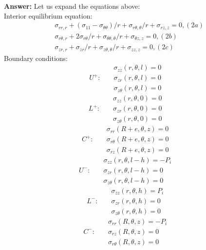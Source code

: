 \documentclass[letter,12pt]{article}
\begin{document}
\noindent \textbf{Answer:} Let us expand the equations above: \\
Interior equilibrium equation:
\begin{equation}
\begin{aligned}
& \sigma_{rr,r}+(\sigma_{11}-\sigma_{\theta \theta})/r +\sigma_{r\theta,\theta}/r +\sigma_{rz,z}=0, (2a) \\
& \sigma_{r\theta,r}+ 2\sigma_{r\theta}/r+ \sigma_{\theta \theta,\theta}/r +\sigma_{\theta z,z}=0, (2b) \\
& \sigma_{zr,r}+ \sigma_{zr}/r+ \sigma_{z\theta,\theta}/r+ \sigma_{zz,z}=0, (2c)
\end{aligned}
\end{equation}
Boundary conditions: 
\begin{equation}
U^{+}: \text{	}
\begin{aligned}
&\sigma_{zz}(r,\theta,l)=0\\
&\sigma_{zr}(r,\theta,l)=0\\
&\sigma_{z\theta}(r,\theta,l)=0
\end{aligned}
\end{equation}
\begin{equation}
L^{+}: \text{	}
\begin{aligned}
&\sigma_{zz}(r,\theta,0)=0\\
&\sigma_{zr}(r,\theta,0)=0\\
&\sigma_{z\theta}(r,\theta,0)=0
\end{aligned}
\end{equation}
\begin{equation}
C^{+}: \text{	}
\begin{aligned}
&\sigma_{rr}(R+e,\theta,z)=0\\
&\sigma_{r\theta}(R+e,\theta,z)=0\\
&\sigma_{rz}(R+e,\theta,z)=0
\end{aligned}
\end{equation}
\begin{equation}
U^{-}: \text{	}
\begin{aligned}
&\sigma_{zz}(r,\theta,l-h)=-P_i\\
&\sigma_{zr}(r,\theta,l-h)=0\\
&\sigma_{z\theta}(r,\theta,l-h)=0
\end{aligned}
\end{equation}
\begin{equation}
L^{-}: \text{	}
\begin{aligned}
&\sigma_{zz}(r,\theta,h)=P_i\\
&\sigma_{zr}(r,\theta,h)=0\\
&\sigma_{z\theta}(r,\theta,h)=0
\end{aligned}
\end{equation}
\begin{equation}
C^{-}: \text{	}
\begin{aligned}
&\sigma_{rr}(R,\theta,z)=-P_i\\
&\sigma_{rz}(R,\theta,z)=0\\
&\sigma_{r\theta}(R,\theta,z)=0
\end{aligned}
\end{equation}
\\ 


%


 
 
 


 
\end{document}
